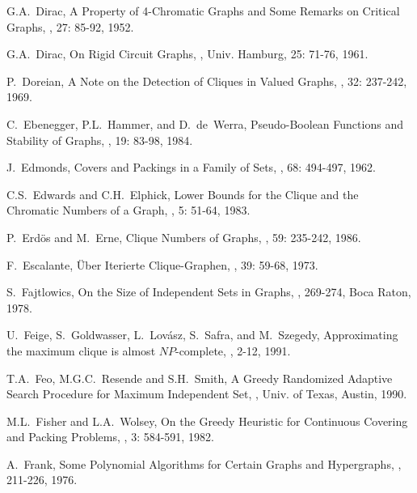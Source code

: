 \begin{thebibliography}{10}
G.A.~Dirac,
\newblock A Property of 4-Chromatic Graphs and Some Remarks on
Critical Graphs,
, 27: 85-92, 1952.

G.A.~Dirac,
\newblock On Rigid Circuit Graphs,
, Univ. Hamburg, 25: 71-76, 1961.

P.~Doreian,
\newblock A Note on the Detection of Cliques in Valued Graphs,
, 32: 237-242, 1969.

C.~Ebenegger, P.L.~Hammer, and D.~de~Werra,
\newblock Pseudo-Boolean Functions and Stability of Graphs,
, 19: 83-98, 1984.

J.~Edmonds,
\newblock Covers and Packings in a Family of Sets,
, 68: 494-497, 1962.

C.S.~Edwards and C.H.~Elphick,
\newblock Lower Bounds for the Clique and the Chromatic Numbers of a
Graph,
, 5: 51-64, 1983.

P.~Erd\"{o}s and M.~Erne,
\newblock Clique Numbers of Graphs,
, 59: 235-242, 1986.

F.~Escalante,
\newblock \"{U}ber Iterierte Clique-Graphen,
, 39: 59-68, 1973.

S.~Fajtlowics,
\newblock On the Size of Independent Sets in Graphs,
, 269-274, Boca Raton, 1978.

U.~Feige, S.~Goldwasser, L.~Lov\'{a}sz, S.~Safra, and M.~Szegedy,
\newblock Approximating the maximum clique is almost $NP$-complete,
, 2-12, 1991.

T.A.~Feo, M.G.C.~Resende and S.H.~Smith,
\newblock A Greedy Randomized Adaptive Search Procedure for Maximum
Independent Set,
, Univ. of Texas, Austin, 1990.

M.L.~Fisher and L.A.~Wolsey,
\newblock On the Greedy Heuristic for Continuous Covering and
Packing Problems,
, 3: 584-591, 1982.

A.~Frank,
\newblock Some Polynomial Algorithms for Certain Graphs and
Hypergraphs,
, 211-226, 1976.


\end{thebibliography}
